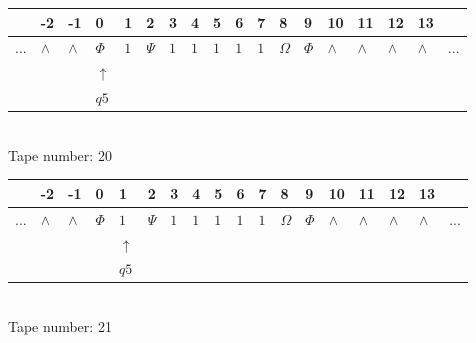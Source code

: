 \documentclass[11pt]{article}
\begin{document}
\begin{table}[H]
\centering
\begin{tabular}{llllllllllllllllll}
 & -2 & -1 & 0 & 1 & 2 & 3 & 4 & 5 & 6 & 7 & 8 & 9 & 10 & 11 & 12 & 13 & \\
\hline
$...$ & \multicolumn{1}{|l|}{$\wedge$} & \multicolumn{1}{|l|}{$\wedge$} & \multicolumn{1}{|l|}{$\Phi$} & \multicolumn{1}{|l|}{$1$} & \multicolumn{1}{|l|}{$\Psi$} & \multicolumn{1}{|l|}{$1$} & \multicolumn{1}{|l|}{$1$} & \multicolumn{1}{|l|}{$1$} & \multicolumn{1}{|l|}{$1$} & \multicolumn{1}{|l|}{$1$} & \multicolumn{1}{|l|}{$\Omega$} & \multicolumn{1}{|l|}{$\Phi$} & \multicolumn{1}{|l|}{$\wedge$} & \multicolumn{1}{|l|}{$\wedge$} & \multicolumn{1}{|l|}{$\wedge$} & \multicolumn{1}{|l|}{$\wedge$} & $...$\\
\hline
&  &  & $\uparrow$ &  &  &  &  &  &  &  &  &  &  &  &  &  &  \\
&  &  & $ q5 $ &  &  &  &  &  &  &  &  &  &  &  &  &  &  \\
\end{tabular}
\\
Tape number: 20
\noindent\makebox[\linewidth]{\hdashrule{\textwidth}{1pt}{1pt}}\end{table}

\begin{table}[H]
\centering
\begin{tabular}{llllllllllllllllll}
 & -2 & -1 & 0 & 1 & 2 & 3 & 4 & 5 & 6 & 7 & 8 & 9 & 10 & 11 & 12 & 13 & \\
\hline
$...$ & \multicolumn{1}{|l|}{$\wedge$} & \multicolumn{1}{|l|}{$\wedge$} & \multicolumn{1}{|l|}{$\Phi$} & \multicolumn{1}{|l|}{$1$} & \multicolumn{1}{|l|}{$\Psi$} & \multicolumn{1}{|l|}{$1$} & \multicolumn{1}{|l|}{$1$} & \multicolumn{1}{|l|}{$1$} & \multicolumn{1}{|l|}{$1$} & \multicolumn{1}{|l|}{$1$} & \multicolumn{1}{|l|}{$\Omega$} & \multicolumn{1}{|l|}{$\Phi$} & \multicolumn{1}{|l|}{$\wedge$} & \multicolumn{1}{|l|}{$\wedge$} & \multicolumn{1}{|l|}{$\wedge$} & \multicolumn{1}{|l|}{$\wedge$} & $...$\\
\hline
&  &  &  & $\uparrow$ &  &  &  &  &  &  &  &  &  &  &  &  &  \\
&  &  &  & $ q5 $ &  &  &  &  &  &  &  &  &  &  &  &  &  \\
\end{tabular}
\\
Tape number: 21
\noindent\makebox[\linewidth]{\hdashrule{\textwidth}{1pt}{1pt}}\end{table}
\end{document}
